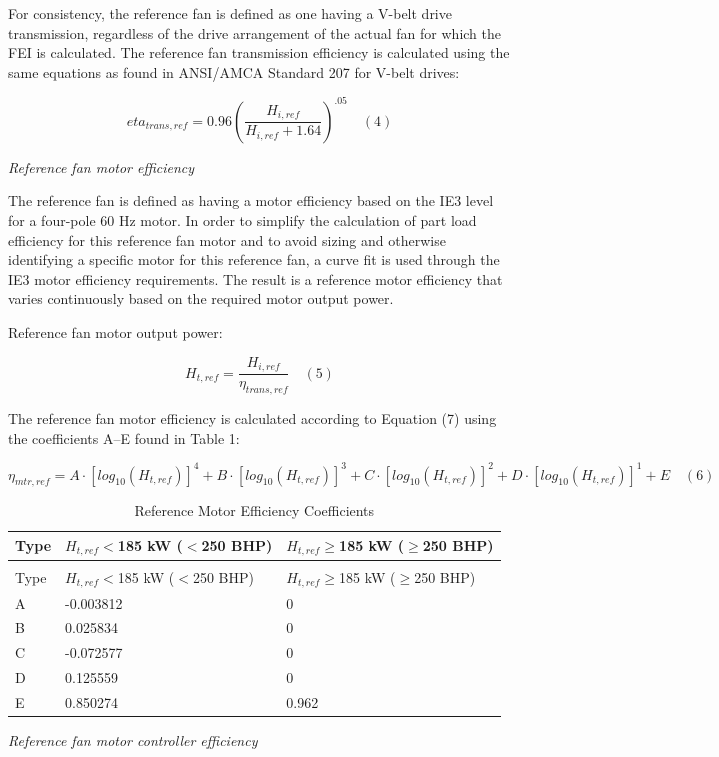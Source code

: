 For consistency, the reference fan is defined as one having a V-belt drive transmission, regardless of the drive arrangement of the actual fan for which the FEI is calculated. The reference fan transmission efficiency is calculated using the same equations as found in ANSI/AMCA Standard 207 for V-belt drives:

$$eta_{trans,ref}=0.96(\frac{H_{i,ref}}{H_{i,ref}+1.64})^{.05} \quad (4) $$ 

\emph{Reference fan motor efficiency}

The reference fan is defined as having a motor efficiency based on the IE3 level for a four-pole 60 Hz motor. In order to simplify the calculation of part load efficiency for this reference fan motor and to avoid sizing and otherwise identifying a specific motor for this reference fan, a curve fit is used through the IE3 motor efficiency requirements. The result is a reference motor efficiency that varies continuously based on the required motor output power.

Reference fan motor output power:

$$H_{t,ref}=\frac{H_{i,ref}}{\eta_{trans,ref}} \quad (5) $$ 

The reference fan motor efficiency is calculated according to Equation (7) using the coefficients A–E found in Table 1:

$$\eta_{mtr,ref} = A\cdot[log_{10} (H_{t,ref})]^4 + B\cdot[log_{10} (H_{t,ref})]^3 +C\cdot[log_{10} (H_{t,ref})]^2 +D\cdot[log_{10} (H_{t,ref})]^1 + E \quad (6) $$ 

\begin{longtable}[c]{p{1.0in}p{1.0in}p{1.0in}}
\caption{Reference Motor Efficiency Coefficients \label{table:reference-motor-efficiency-coefficients}} \tabularnewline
\toprule 
Type & \(H_{t,ref}\)$<$185 kW ($<$250 BHP) & \(H_{t,ref}\)$\geq$185 kW ($\geq$250 BHP) \tabularnewline \midrule
\midrule
\endfirsthead

\caption[]{Reference Motor Efficiency Coefficients} \tabularnewline
\toprule 
Type & \(H_{t,ref}\)$<$185 kW ($<$250 BHP) & \(H_{t,ref}\)$\geq$185 kW ($\geq$250 BHP) \tabularnewline \midrule
\midrule
\endhead

A & -0.003812 & 0 \tabularnewline
B & 0.025834 & 0 \tabularnewline
C & -0.072577 & 0 \tabularnewline
D & 0.125559 & 0 \tabularnewline
E & 0.850274 & 0.962 \tabularnewline
\bottomrule
\end{longtable}

\emph{Reference fan motor controller efficiency}

